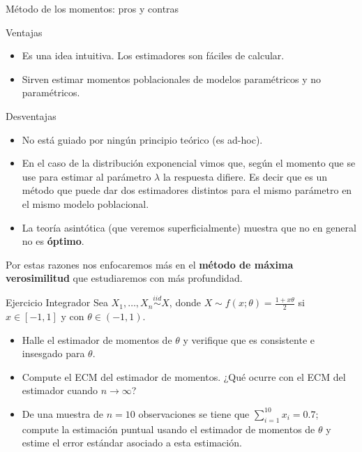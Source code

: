 \documentclass{beamer}
\theoremstyle{definition}
\begin{document}
\begin{frame}{\color{rosee}M\'etodo de los momentos: pros y contras}
  \begin{block}{Ventajas}
    \begin{itemize}
    \item Es una idea intuitiva. Los estimadores son f\'aciles de calcular.
    \item Sirven estimar momentos poblacionales de modelos paramétricos y no paramétricos.
    \end{itemize}
  \end{block}
  \begin{block}{Desventajas}
    \begin{itemize}
    \item No est\'a guiado por ning\'un principio te\'orico (es
      ad-hoc).
      \item En el caso de la distribución exponencial vimos que, según el momento que se use para estimar al parámetro $\lambda$ la respuesta difiere. Es decir que es un método que puede dar dos estimadores distintos para el mismo parámetro en el mismo modelo poblacional.
    \item La teor\'ia asint\'otica (que veremos superficialmente)
      muestra que no en general no es \textbf{\'optimo}.
    \end{itemize}
    Por estas razones nos enfocaremos m\'as en el \textbf{m\'etodo de
      m\'axima verosimilitud} que estudiaremos con m\'as profundidad.
  \end{block}
\end{frame}

\begin{frame}{\color{rosee}Ejercicio Integrador}
Sea $X_1,\dots,X_n\stackrel{iid}{\sim}X$, donde $X\sim f(x;\theta) = \frac{1+x\theta}{2}$ si $x\in [-1,1]$ y con $\theta \in (-1,1)$.\bigskip
\begin{itemize}
    \item Halle el estimador de momentos de $\theta$ y verifique que es consistente e insesgado para $\theta$.\medskip
    \item Compute el ECM del estimador de momentos. ¿Qué ocurre con el ECM del estimador cuando $n\to \infty$?\medskip
    \item De una muestra de $n=10$ observaciones se tiene que $\sum_{i=1}^{10}x_i=0.7$; compute la estimación puntual usando el estimador de momentos de $\theta$ y estime el error estándar asociado a esta estimación.

\end{itemize}
\end{frame}
\end{document}
